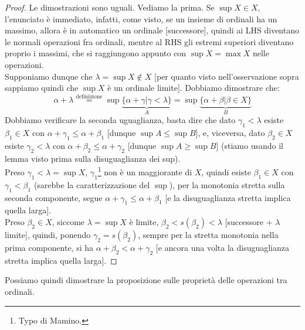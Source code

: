 \documentclass[11pt]{scrartcl}
\begin{document}
\begin{proof}
	Le dimostrazioni sono uguali. Vediamo la prima. Se $\sup X \in X$, l'enunciato è immediato, infatti, come visto, se un insieme di ordinali ha un massimo, allora è in automatico un ordinale [successore], quindi ai LHS diventano le normali operazioni fra ordinali,
	mentre al RHS gli estremi superiori diventano proprio i massimi, che si raggiungono appunto con $\sup X = \max X$ nelle operazioni.\\
	Supponiamo dunque che $\lambda = \sup X \not \in X$ [per quanto visto nell'osservazione sopra sappiamo quindi che $\sup X$ è un ordinale limite]. Dobbiamo dimostrare che:
	\[ \alpha + \lambda \overset{\text{definizione}}{=} \sup\underbrace{\{\alpha + \gamma | \gamma < \lambda\}}_{A} = \sup\underbrace{\{\alpha + \beta | \beta \in X\}}_{B}
		\]
	Dobbiamo verificare la seconda uguaglianza, basta dire che dato $\gamma_1 < \lambda$ esiste $\beta_1 \in X$ con $\alpha + \gamma_1 \leq \alpha + \beta_1$ [dunque $\sup A \leq \sup B$], e, viceversa, dato $\beta_2 \in X$ esiste $\gamma_2 < \lambda$ con $\alpha + \beta_2 \leq \alpha + \gamma_2$ [dunque $\sup A \geq \sup B$] (stiamo usando il lemma visto prima sulla disuguaglianza dei sup).\\
	Preso $\gamma_1 < \lambda = \sup X$, $\gamma_1$\footnote{Typo di Mamino.} non è un maggiorante di $X$, quindi esiste $\beta_1 \in X$ con $\gamma_1 < \beta_1$ (sarebbe la caratterizzazione del $\sup$),
	per la monotonia stretta sulla seconda componente, segue $\alpha + \gamma_1 \leq \alpha + \beta_1$ [e la disuguaglianza stretta implica quella larga].\\
	Preso $\beta_2 \in X$, siccome $\lambda = \sup X$ è limite, $\beta_2 < s(\beta_2) < \lambda$ [successore + $\lambda$ limite], quindi, ponendo $\gamma_2 = s(\beta_2)$, sempre per la stretta monotonia nella prima componente, si ha $\alpha + \beta_2 < \alpha + \gamma_2$ [e ancora una volta la disuguaglianza stretta implica quella larga].
\end{proof}

Possiamo quindi dimostrare la proposizione sulle proprietà delle operazioni tra ordinali.
\end{document}
